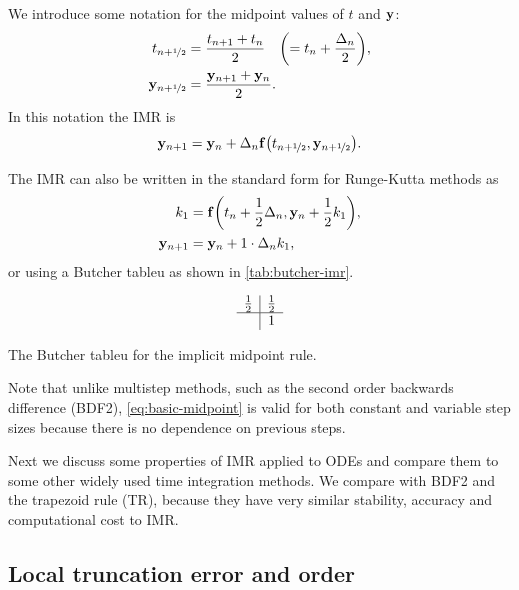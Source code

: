 We introduce some notation for the midpoint values of $t$ and $\mathbf{y}$:
\begin{equation}
  \begin{aligned}
    t_{n+\nicefrac{1}{2}} & = \frac{t_{n+1} + t_n}{2} \quad {\left( = t_n + \frac{\Delta_{n}}{2} \right)}, \\
    \mathbf{y}_{n+\nicefrac{1}{2}} &= \frac{\mathbf{y}_{n+1} + \mathbf{y}_n}{2}.
  \end{aligned}
\end{equation}
In this notation the IMR is
\begin{equation}
  \mathbf{y}_{n+1} = \mathbf{y}_n + \Delta_{n} {\mathbf{f}{\left( t_{n+\nicefrac{1}{2}}, \mathbf{y}_{n+\nicefrac{1}{2}} \right)}}.
  \label{eq:basic-midpoint}
\end{equation}

The IMR can also be written in the standard form for Runge-Kutta methods as
\begin{equation}
  \begin{aligned}
    k_1 &= {\mathbf{f}{\left( t_n + \frac{1}{2} \Delta_{n}, \mathbf{y}_n + \frac{1}{2} k_1 \right)}}, \\
    \mathbf{y}_{n+1} &= \mathbf{y}_n + 1 \cdot \Delta_{n} k_1,
  \end{aligned}
\end{equation}
or using a Butcher tableu \cite[pg. 135]{HairerNorsettWanner} as shown in \autoref{tab:butcher-imr}.

\begin{table}
  \begin{equation*}
    \begin{array}{c|c}
      \frac{1}{2}  &     \frac{1}{2}  \\
      \hline
                   & 1 \\
    \end{array}
  \end{equation*}
  \caption{The Butcher tableu for the implicit midpoint rule.}
  \label{tab:butcher-imr}
\end{table}

Note that unlike multistep methods, such as the second order backwards difference (BDF2), \eqref{eq:basic-midpoint} is valid for both constant and variable step sizes because there is no dependence on previous steps.

Next we discuss some properties of IMR applied to ODEs and compare them to some other widely used time integration methods.
We compare with BDF2 and the trapezoid rule (TR), because they have very similar stability, accuracy and computational cost to IMR.


\subsection{Local truncation error and order}
\label{sec:deriv-local-trunc}

